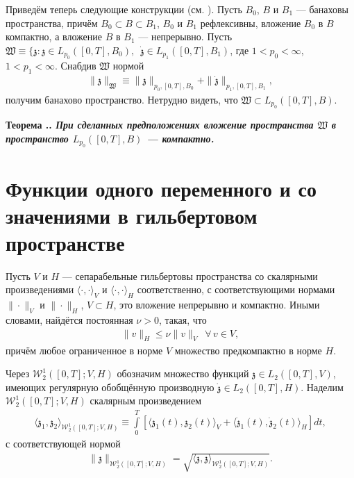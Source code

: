 \documentclass{report}
\newcounter{rem}[section]
\newcounter{theor}[section]
\renewcommand{\thetheor}{\thesection.\arabic{theor}}
\newenvironment{Theorem}{\par\refstepcounter{theor}\bf Теорема \thetheor. \it}{\rm\par}
\begin{document}
Приведём теперь следующие конструкции (см. \cite[стр.70]{Lions1972}). Пусть  $B_0$, $B$ и $B_1$ --- банаховы пространства, причём $B_0
\subset B\subset B_1$, $B_0$ и $B_1$ рефлексивны, вложение $B_0$ в $B$ компактно, а вложение $B$ в $B_1$ --- непрерывно. Пусть $\mathfrak{W}
\equiv\{\mathfrak{z}:\mathfrak{z}\in L_{p_0}([0,T],B_0),\,\,\,\dot{\mathfrak{z}}\in L_{p_1}([0,T],B_1)$, где $1<p_0<\infty$, $1<p_1<\infty$. Снабдив $\mathfrak{W}$ нормой
\begin{gather*}
\|\mathfrak{z}\|_{\mathfrak{W}}\equiv\|\mathfrak{z}\|_{p_0,[0,T],B_0}+\|\dot{\mathfrak{z}}\|_{p_1,[0,T],B_1},
\end{gather*}
получим банахово пространство. Нетрудно видеть, что $\mathfrak{W}\subset L_{p_0}([0,T],B)$.

\begin{Theorem}\label{B0BB1Theorem}\cite[теорема 5.1 на стр.70]{Lions1972}
При сделанных предположениях вложение пространства $\mathfrak{W}$ в пространство $L_{p_0}([0,T],B)$ --- компактно.
\end{Theorem}

        \section{Функции одного переменного и со значениями в гильбертовом пространстве}
Пусть $V$ и $H$ --- сепарабельные гильбертовы пространства со скалярными произведениями $\langle\cdot,\cdot\rangle_V$ и $\langle\cdot,\cdot\rangle_H$ соответственно, с соответствующими
нормами $\|\cdot\|_V$ и $\|\cdot\|_H$, $V\subset H$, это вложение непрерывно и компактно. Иными словами, найдётся постоянная $\nu>0$, такая, что
\begin{gather*}
\|v\|_H\leqslant\nu\|v\|_V\,\,\,\forall\,v\in V,
\end{gather*}
причём любое ограниченное в норме $V$ множество предкомпактно в норме $H$.

Через $\mathcal{W}^1_2([0,T];V,H)$ обозначим множество функций $\mathfrak{z}\in L_2([0,T],V)$, имеющих регулярную обобщённую производную
$\dot{\mathfrak{z}}\in L_2([0,T],H)$. Наделим $\mathcal{W}^1_2([0,T];V,H)$ скалярным произведением
\begin{gather*}
\langle\mathfrak{z}_1,\mathfrak{z}_2\rangle_{\mathcal{W}^1_2([0,T];V,H)}\equiv
\int\limits_0^T[\langle\mathfrak{z}_1(t),\mathfrak{z}_2(t)\rangle_V+\langle\dot{\mathfrak{z}}_1(t),\dot{\mathfrak{z}}_2(t)\rangle_H]dt,
\end{gather*}
с соответствующей нормой
\begin{gather*}
\|\mathfrak{z}\|_{\mathcal{W}^1_2([0,T];V,H)}=\sqrt{\langle\mathfrak{z},\mathfrak{z}\rangle_{\mathcal{W}^1_2([0,T];V,H)}}.
\end{gather*}
\end{document}
